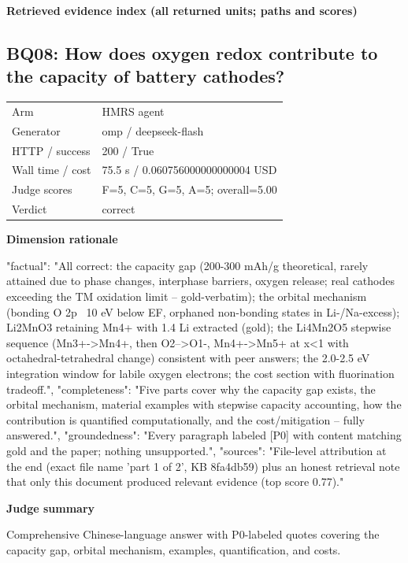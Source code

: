 \documentclass[10pt]{article}
\begin{document}
\textbf{Retrieved evidence index (all returned units; paths and scores) }
\begin{EvidenceText}
\end{EvidenceText}
\subsection{BQ08: How does oxygen redox contribute to the capacity of battery cathodes?}
\begin{tabular}{@{}ll@{}}
Arm & HMRS agent\\
Generator & omp / deepseek-flash\\
HTTP / success & 200 / True\\
Wall time / cost & 75.5 s / 0.060756000000000004 USD\\
Judge scores & F=5, C=5, G=5, A=5; overall=5.00\\
Verdict & correct\\
\end{tabular}

\textbf{Dimension rationale}
\begin{EvidenceText}
{
  "factual": "All correct: the capacity gap (200-300 mAh/g theoretical, rarely attained due to phase changes, interphase barriers, oxygen release; real cathodes exceeding the TM oxidation limit -- gold-verbatim); the orbital mechanism (bonding O 2p ~10 eV below EF, orphaned non-bonding states in Li-/Na-excess); Li2MnO3 retaining Mn4+ with 1.4 Li extracted (gold); the Li4Mn2O5 stepwise sequence (Mn3+->Mn4+, then O2-->O1-, Mn4+->Mn5+ at x<1 with octahedral-tetrahedral change) consistent with peer answers; the 2.0-2.5 eV integration window for labile oxygen electrons; the cost section with fluorination tradeoff.",
  "completeness": "Five parts cover why the capacity gap exists, the orbital mechanism, material examples with stepwise capacity accounting, how the contribution is quantified computationally, and the cost/mitigation -- fully answered.",
  "groundedness": "Every paragraph labeled [P0] with content matching gold and the paper; nothing unsupported.",
  "sources": "File-level attribution at the end (exact file name 'part 1 of 2', KB 8fa4db59) plus an honest retrieval note that only this document produced relevant evidence (top score 0.77)."
}
\end{EvidenceText}

\textbf{Judge summary}
\begin{EvidenceText}
Comprehensive Chinese-language answer with P0-labeled quotes covering the capacity gap, orbital mechanism, examples, quantification, and costs.
\end{EvidenceText}
\end{document}
